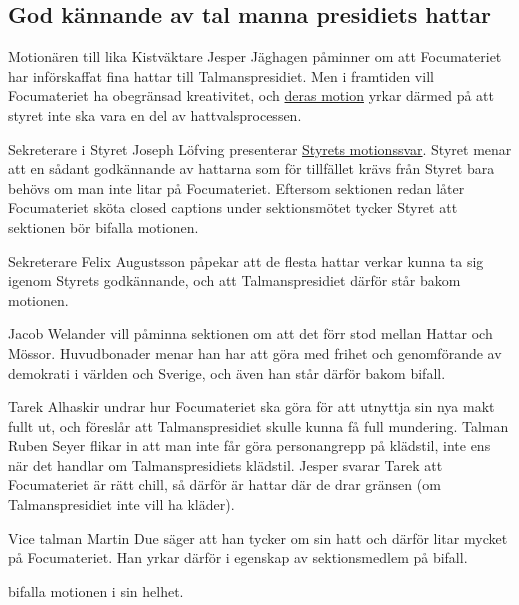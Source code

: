 \documentclass[hidelinks]{sektionsmote}
\begin{document}
\subsection{God kännande av tal manna presidiets hattar}
Motionären till lika Kistväktare Jesper Jäghagen påminner om att Focumateriet har införskaffat fina hattar till Talmanspresidiet.
Men i framtiden vill Focumateriet ha obegränsad kreativitet, och \hyperlink{bilagor/motionfoc.pdf.1}{deras motion} yrkar därmed på att styret inte ska vara en del av hattvalsprocessen.\par
Sekreterare i Styret Joseph Löfving presenterar \hyperlink{bilagor/motionfoc-svar.pdf.1}{Styrets motionssvar}.
Styret menar att en sådant godkännande av hattarna som för tillfället krävs från Styret bara behövs om man inte litar på Focumateriet.
Eftersom sektionen redan låter Focumateriet sköta closed captions under sektionsmötet tycker Styret att sektionen bör bifalla motionen.\par
Sekreterare Felix Augustsson påpekar att de flesta hattar verkar kunna ta sig igenom Styrets godkännande, och att Talmanspresidiet därför står bakom motionen.\par
Jacob Welander vill påminna sektionen om att det förr stod mellan Hattar och Mössor.
Huvudbonader menar han har att göra med frihet och genomförande av demokrati i världen och Sverige, och även han står därför bakom bifall.\par
Tarek Alhaskir undrar hur Focumateriet ska göra för att utnyttja sin nya makt fullt ut, och föreslår att Talmanspresidiet skulle kunna få full mundering.
Talman Ruben Seyer flikar in att man inte får göra personangrepp på klädstil, inte ens när det handlar om Talmanspresidiets klädstil.
Jesper svarar Tarek att Focumateriet är rätt chill, så därför är hattar där de drar gränsen (om Talmanspresidiet inte vill ha kläder).\par
Vice talman Martin Due säger att han tycker om sin hatt och därför litar mycket på Focumateriet.
Han yrkar därför i egenskap av sektionsmedlem på bifall.

\begin{beslut}
  \item bifalla motionen i sin helhet.
\end{beslut}
\end{document}
